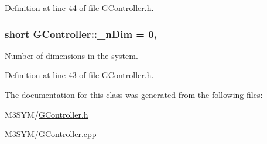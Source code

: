 Definition at line 44 of file G\+Controller.\+h.

\hypertarget{classGController_af3276bac24eb8b3b1bca31007b941c0f}{
\subsubsection[{\+\_\+n\+Dim}]{\setlength{\rightskip}{0pt plus 5cm}short G\+Controller\+::\+\_\+n\+Dim = 0\hspace{0.3cm}{\ttfamily [static]}, {\ttfamily [private]}}}\label{classGController_af3276bac24eb8b3b1bca31007b941c0f}


Number of dimensions in the system. 



Definition at line 43 of file G\+Controller.\+h.



The documentation for this class was generated from the following files\+:\begin{DoxyCompactItemize}
\item 
M3\+S\+Y\+M/\hyperlink{GController_8h}{G\+Controller.\+h}\item 
M3\+S\+Y\+M/\hyperlink{GController_8cpp}{G\+Controller.\+cpp}\end{DoxyCompactItemize}
